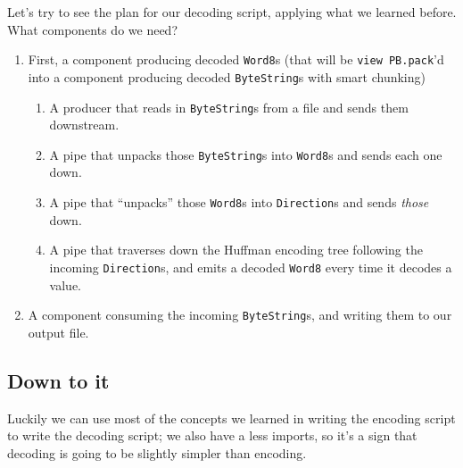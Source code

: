 \documentclass[]{article}
\begin{document}
Let's try to see the plan for our decoding script, applying what we
learned before. What components do we need?

\begin{enumerate}
\def\labelenumi{\arabic{enumi}.}
\tightlist
\item
  First, a component producing decoded \texttt{Word8}s (that will be
  \texttt{view\ PB.pack}'d into a component producing decoded
  \texttt{ByteString}s with smart chunking)

  \begin{enumerate}
  \def\labelenumii{\arabic{enumii}.}
  \tightlist
  \item
    A producer that reads in \texttt{ByteString}s from a file and sends
    them downstream.
  \item
    A pipe that unpacks those \texttt{ByteString}s into \texttt{Word8}s
    and sends each one down.
  \item
    A pipe that ``unpacks'' those \texttt{Word8}s into
    \texttt{Direction}s and sends \emph{those} down.
  \item
    A pipe that traverses down the Huffman encoding tree following the
    incoming \texttt{Direction}s, and emits a decoded \texttt{Word8}
    every time it decodes a value.
  \end{enumerate}
\item
  A component consuming the incoming \texttt{ByteString}s, and writing
  them to our output file.
\end{enumerate}

\subsection{Down to it}\label{down-to-it-1}

Luckily we can use most of the concepts we learned in writing the
encoding script to write the decoding script; we also have a less
imports, so it's a sign that decoding is going to be slightly simpler
than encoding.
\end{document}
